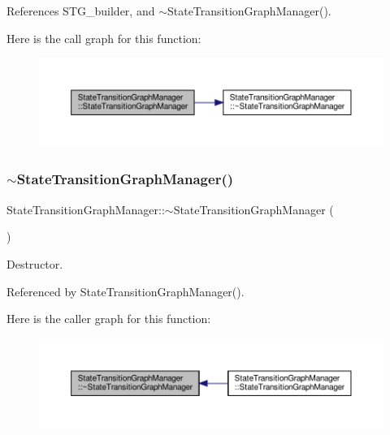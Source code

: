 References S\+T\+G\+\_\+builder, and $\sim$\+State\+Transition\+Graph\+Manager().

Here is the call graph for this function\+:
\nopagebreak
\begin{figure}[H]
\begin{center}
\leavevmode
\includegraphics[width=350pt]{d9/dfd/classStateTransitionGraphManager_a138e3a539f39750d6715514a28644970_cgraph}
\end{center}
\end{figure}
\mbox{\label{classStateTransitionGraphManager_a8892ac361d932cbf473d214800e4b067}} 
\subsubsection{\texorpdfstring{$\sim$\+State\+Transition\+Graph\+Manager()}{~StateTransitionGraphManager()}}
{\footnotesize\ttfamily State\+Transition\+Graph\+Manager\+::$\sim$\+State\+Transition\+Graph\+Manager (\begin{DoxyParamCaption}{ }\end{DoxyParamCaption})\hspace{0.3cm}{\ttfamily [default]}}



Destructor. 



Referenced by State\+Transition\+Graph\+Manager().

Here is the caller graph for this function\+:
\nopagebreak
\begin{figure}[H]
\begin{center}
\leavevmode
\includegraphics[width=350pt]{d9/dfd/classStateTransitionGraphManager_a8892ac361d932cbf473d214800e4b067_icgraph}
\end{center}
\end{figure}


